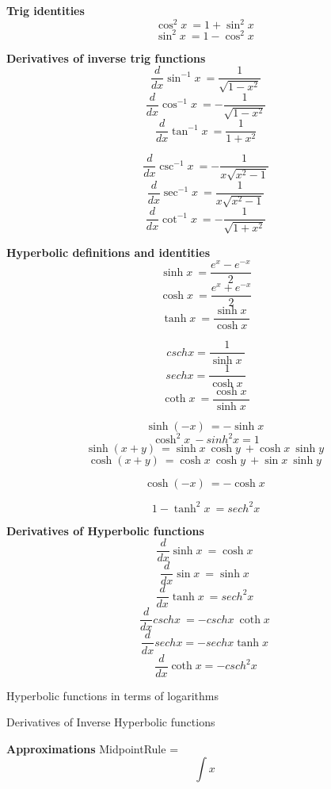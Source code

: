 \documentclass{book}
\title {}
\author{}
\date{}
\begin{document}
\textbf{Trig identities}
\[\cos^2{x}\ = 1 + \sin^2{x}\ \]
\[\sin^2{x}\ = 1 - \cos^2{x}\ \]

\textbf{Derivatives of inverse trig functions}
\[ \frac{d}{dx} \sin^{-1}{x}\ = \frac{1}{\sqrt{1-x^2}} \]
\[ \frac{d}{dx} \cos^{-1}{x}\ = -\frac{1}{\sqrt{1-x^2}} \]
\[ \frac{d}{dx} \tan^{-1}{x}\ = \frac{1}{1+x^2} \]

\[ \frac{d}{dx} \csc^{-1}{x}\ = -\frac{1}{x \sqrt{x^2-1}} \]
\[ \frac{d}{dx} \sec^{-1}{x}\ = \frac{1}{x \sqrt{x^2-1}} \]
\[ \frac{d}{dx} \cot^{-1}{x}\ = -\frac{1}{\sqrt{1+x^2}} \]

\textbf{Hyperbolic definitions and identities}
\[\sinh{x}\ = \frac{e^x - e^{-x}}{2}\]
\[\cosh{x}\ = \frac{e^x + e^{-x}}{2}\]
\[\tanh{x}\ = \frac{ \sinh{x}\ }{ \cosh{x}\ }\]

\[csch{x} = \frac{1}{\sinh{x}\ }\]
\[sech{x} = \frac{1}{\cosh{x}\ }\]
\[\coth{x}\ = \frac{\cosh{x}\ }{\sinh{x}\ } \]

\[\sinh{(-x)}\ = -\sinh{x}\ \]
\[\cosh^2{x}\ - sinh^2{x} = 1 \]
\[\sinh{(x+y)}\ = \sinh{x}\ \cosh{y}\ + \cosh{x}\ \sinh{y}\ \]
\[\cosh{(x+y)}\ = \cosh{x}\ \cosh{y}\ + \sin{x}\ \sinh{y}\ \]

\[\cosh{(-x)}\ = -\cosh{x}\ \]

\[1 - \tanh^2{x}\ = sech^2{x}\]

\textbf{Derivatives of Hyperbolic functions}
\[ \frac{d}{dx} \sinh{x}\ = \cosh{x}\ \]
\[ \frac{d}{dx} \sin{x}\ = \sinh{x}\ \]
\[ \frac{d}{dx} \tanh{x}\ = sech^2{x}\ \]
\[ \frac{d}{dx} csch{x}\ = -csch{x}\ \coth{x}\ \]
\[ \frac{d}{dx} sech{x} = -sech{x} \tanh{x}\ \]
\[ \frac{d}{dx} \coth{x} = -csch^2{x}\]

Hyperbolic functions in terms of logarithms

Derivatives of Inverse Hyperbolic functions 

\textbf{Approximations}
MidpointRule = \[\int{x}\ \]
\end{document}
